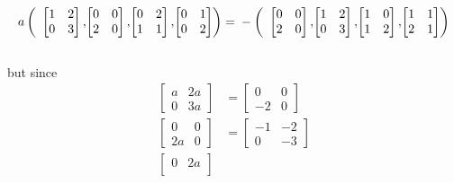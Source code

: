 \documentclass{article}
\begin{document}
\begin{solution}
\[\]
\[
a \left(
\begin{array}{c@{} c@{} c@{} c@{}}
\begin{bmatrix}
1	&	2	\\
0	&	3
\end{bmatrix},
&
\begin{bmatrix}
0	&	0	\\
2	&	0
\end{bmatrix},
&
\begin{bmatrix}
0	&	2	\\
1	&	1
\end{bmatrix},
&
\begin{bmatrix}
0	&	1	\\
0	&	2
\end{bmatrix}
\end{array}
\right)
=\\
-
\left(
\begin{array}{c@{} c@{} c@{} c@{}}
\begin{bmatrix}
0	&	0	\\
2	&	0
\end{bmatrix},
&
\begin{bmatrix}
1	&	2	\\
0	&	3
\end{bmatrix},
&
\begin{bmatrix}
1	&	0	\\
1	&	2
\end{bmatrix},
&
\begin{bmatrix}
1	&	1	\\
2	&	1
\end{bmatrix}
\end{array}
\right)
\]\\
but since
\begin{align*}
\begin{bmatrix}
a	&	2a	\\
0	&	3a
\end{bmatrix}
&= \begin{bmatrix}
0	&	0	\\
-2	&	0
\end{bmatrix}\\
\begin{bmatrix}
0	&	0	\\
2a	&	0
\end{bmatrix}
&=
\begin{bmatrix}
-1	&	-2	\\
0	&	-3
\end{bmatrix}\\
\begin{bmatrix}
0	&	2a	\\

\end{bmatrix}
\end{align*}
\end{solution}
\end{document}
